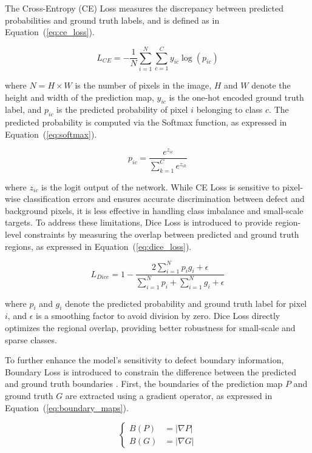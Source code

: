 \documentclass[sn-basic]{sn-jnl}
\theoremstyle{thmstyleone}%
\theoremstyle{thmstyletwo}%
\theoremstyle{thmstylethree}%
\begin{document}
The Cross-Entropy (CE) Loss measures the discrepancy between predicted probabilities and ground truth labels, and is defined as in Equation~(\ref{eq:ce_loss}).

\begin{equation}
L_{CE} = - \frac{1}{N} \sum_{i=1}^{N} \sum_{c=1}^{C} y_{ic} \log(p_{ic})
\label{eq:ce_loss}
\end{equation}

where $N = H \times W$ is the number of pixels in the image, $H$ and $W$ denote the height and width of the prediction map, $y_{ic}$ is the one-hot encoded ground truth label, and $p_{ic}$ is the predicted probability of pixel $i$ belonging to class $c$. The predicted probability is computed via the Softmax function, as expressed in Equation~(\ref{eq:softmax}).

\begin{equation}
p_{ic} = \frac{e^{z_{ic}}}{\sum_{k=1}^{C} e^{z_{ik}}}
\label{eq:softmax}
\end{equation}

where $z_{ic}$ is the logit output of the network. While CE Loss is sensitive to pixel-wise classification errors and ensures accurate discrimination between defect and background pixels, it is less effective in handling class imbalance and small-scale targets. To address these limitations, Dice Loss is introduced to provide region-level constraints by measuring the overlap between predicted and ground truth regions, as expressed in Equation~(\ref{eq:dice_loss}).

\begin{equation}
L_{Dice} = 1 - \frac{2 \sum_{i=1}^{N} p_i g_i + \epsilon}{\sum_{i=1}^{N} p_i + \sum_{i=1}^{N} g_i + \epsilon}
\label{eq:dice_loss}
\end{equation}

where $p_i$ and $g_i$ denote the predicted probability and ground truth label for pixel $i$, and $\epsilon$ is a smoothing factor to avoid division by zero. Dice Loss directly optimizes the regional overlap, providing better robustness for small-scale and sparse classes.  

To further enhance the model's sensitivity to defect boundary information, Boundary Loss is introduced to constrain the difference between the predicted and ground truth boundaries \cite{Bokhovkin2019Boundary}. First, the boundaries of the prediction map $P$ and ground truth $G$ are extracted using a gradient operator, as expressed in Equation~(\ref{eq:boundary_maps}).

\begin{equation}
\left\{
\begin{aligned}
B(P) &= |\nabla P| \\
B(G) &= |\nabla G|
\end{aligned}
\right.
\label{eq:boundary_maps}
\end{equation}
\end{document}
